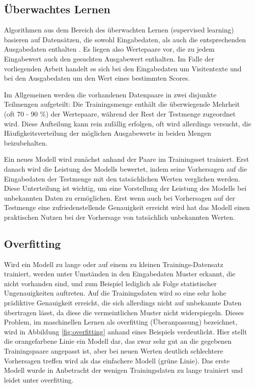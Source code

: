 \subsection{Überwachtes Lernen}\label{section:supervised_learning}

Algorithmen aus dem Bereich des überwachten Lernen (supervised learning) basieren auf Datensätzen, die sowohl Eingabedaten, als auch die entsprechenden Ausgabedaten enthalten \citep{russellArtificialIntelligenceModern2020}. Es liegen also Wertepaare vor, die zu jedem Eingabewert auch den gesuchten Ausgabewert enthalten. Im Falle der vorliegenden Arbeit handelt es sich bei den Eingabedaten um Visitentexte und bei den Ausgabedaten um den Wert eines bestimmten Scores. 

Im Allgemeinen werden die vorhandenen Datenpaare in zwei disjunkte Teilmengen aufgeteilt: Die Trainingsmenge enthält die überwiegende Mehrheit (oft 70 - 90 \%) der Wertepaare, während der Rest der Testmenge zugeordnet wird. Diese Aufteilung kann rein zufällig erfolgen, oft wird allerdings versucht, die Häufigkeitsverteilung der möglichen Ausgabewerte in beiden Mengen beizubehalten.

Ein neues Modell wird zunächst anhand der Paare im Trainingsset trainiert. Erst danach wird die Leistung des Modells bewertet, indem seine Vorhersagen auf die Eingabedaten der Testmenge mit den tatsächlichen Werten verglichen werden. Diese Unterteilung ist wichtig, um eine Vorstellung der Leistung des Modells bei unbekannten Daten zu ermöglichen. Erst wenn auch bei Vorhersagen auf der Testmenge eine zufriedenstellende Genauigkeit erreicht wird hat das Modell einen praktischen Nutzen bei der Vorhersage von tatsächlich unbekannten Werten.

\subsection{Overfitting}\label{section:overfitting}
Wird ein Modell zu lange oder auf einem zu kleinen Trainings-Datensatz trainiert, werden unter Umständen in den Eingabedaten Muster erkannt, die nicht vorhanden sind, und zum Beispiel lediglich als Folge statistischer Ungenauigkeiten auftreten. Auf die Trainingsdaten wird so eine sehr hohe prädiktive Genauigkeit erreicht, die sich allerdings nicht auf unbekannte Daten übertragen lässt, da diese die vermeintlichen Muster nicht widerspiegeln. Dieses Problem, im maschinellen Lernen als overfitting (Überanpassung) bezeichnet, wird in Abbildung \ref{fig:overfitting} anhand eines Beispiels verdeutlicht. Hier stellt die orangefarbene Linie ein Modell dar, das zwar sehr gut an die gegebenen Trainingspaare angepasst ist, aber bei neuen Werten deutlich schlechtere Vorhersagen treffen wird als das einfachere Modell (grüne Linie). Das erste Modell wurde in Anbetracht der wenigen Trainingsdaten zu lange trainiert und leidet unter overfitting.

